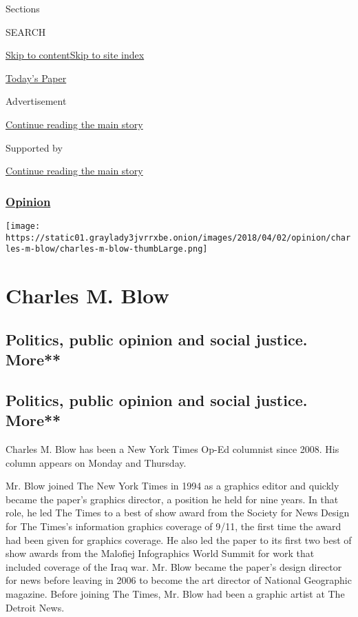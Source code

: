 Sections

SEARCH

\protect\hyperlink{site-content}{Skip to
content}\protect\hyperlink{site-index}{Skip to site index}

\href{https://myaccount.nytimes3xbfgragh.onion/auth/login?response_type=cookie\&client_id=vi}{}

\href{https://www.nytimes3xbfgragh.onion/section/todayspaper}{Today's
Paper}

Advertisement

\protect\hyperlink{after-top}{Continue reading the main story}

Supported by

\protect\hyperlink{after-sponsor}{Continue reading the main story}

\hypertarget{opinion}{%
\subsubsection{\texorpdfstring{\href{/section/opinion}{Opinion}}{Opinion}}\label{opinion}}

\texttt{[image: https://static01.graylady3jvrrxbe.onion/images/2018/04/02/opinion/charles-m-blow/charles-m-blow-thumbLarge.png]}

\hypertarget{charles-m-blow}{%
\section{Charles M. Blow}\label{charles-m-blow}}

\hypertarget{politics-public-opinion-and-social-justice-more}{%
\subsection{Politics, public opinion and social justice.
More**}\label{politics-public-opinion-and-social-justice-more}}

\hypertarget{politics-public-opinion-and-social-justice-more-1}{%
\subsection{Politics, public opinion and social justice.
More**}\label{politics-public-opinion-and-social-justice-more-1}}

Charles M. Blow has been a New York Times Op-Ed columnist since 2008.
His column appears on Monday and Thursday.

Mr. Blow joined The New York Times in 1994 as a graphics editor and
quickly became the paper's graphics director, a position he held for
nine years. In that role, he led The Times to a best of show award from
the Society for News Design for The Times's information graphics
coverage of 9/11, the first time the award had been given for graphics
coverage. He also led the paper to its first two best of show awards
from the Malofiej Infographics World Summit for work that included
coverage of the Iraq war. Mr. Blow became the paper's design director
for news before leaving in 2006 to become the art director of National
Geographic magazine. Before joining The Times, Mr. Blow had been a
graphic artist at The Detroit News.

